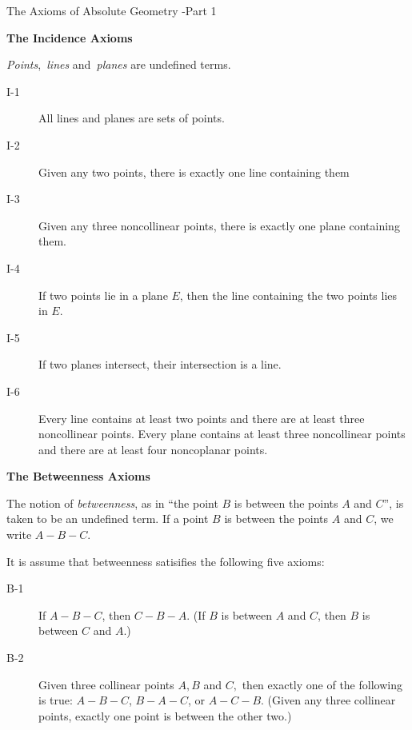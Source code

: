\documentclass[12pt]{article}
\begin{document}
\begin{center}
{\large The Axioms of Absolute Geometry -Part 1\bigskip }
\end{center}

\textbf{The Incidence Axioms}\smallskip 

\emph{Points},\emph{\ lines} and\emph{\ planes} are undefined terms.

\begin{description}
\item[I-1]  All lines and planes are sets of points.

\item[I-2]  Given any two points, there is exactly one line containing them

\item[I-3]  Given any three noncollinear points, there is exactly one plane
containing them.

\item[I-4]  If two points lie in a plane $E$, then the line containing the
two points lies in $E.$

\item[I-5]  If two planes intersect, their intersection is a line.

\item[I-6]  Every line contains at least two points and there are at least
three noncollinear points. Every plane contains at least three noncollinear
points and there are at least four noncoplanar points.
\end{description}

\textbf{The Betweenness Axioms\smallskip }

The notion of \emph{betweenness}, as in ``the point $B$ is between the
points $A$ and $C$'', is taken to be an undefined term. If a point $B$ is
between the points $A$ and $C$, we write $A-B-C$.

It is assume that betweenness satisifies the following five axioms:

\begin{description}
\item[B-1]  If $A-B-C$, then $C-B-A$. (If $B$ is between $A$ and $C$, then $B
$ is between $C$ and $A$.)

\item[B-2]  Given three collinear points $A,B$ and $C,$ then exactly one of
the following is true: $A-B-C$, $B-A-C$, or $A-C-B$. (Given any three
collinear points, exactly one point is between the other two.)
\end{description}
\end{document}
